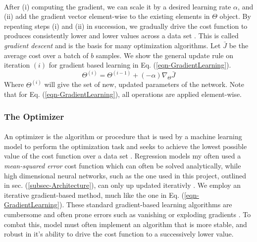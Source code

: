 \documentclass[12pt,letterpaper]{article}
\begin{document}
\paragraph*{}After (i) computing the gradient, we can scale it by a desired learning rate $\alpha$, and (ii) add the gradient vector element-wise to the existing elements in $\Theta$ object. By repeating steps (i) and (ii) in succession, we gradually drive the cost function to produces consistently lower and lower values across a data set \cite{Geron}. This is called \textit{gradient descent} and is the basis for many optimization algorithms. Let $\bar{J}$ be the average cost over a batch of $b$ samples. We show the general update rule on iteration $(i)$ for gradient based learning in Eq. (\ref{eqn-GradientLearning}).
\begin{equation}
\label{eqn-GradientLearning}
\Theta^{(i)} = \Theta^{(i-1)} + (-\alpha) \nabla_{\Theta} \bar{J}
\end{equation}
Where $\Theta^{(i)}$ will give the set of new, updated parameters of the network. Note that for Eq. (\ref{eqn-GradientLearning}), all operations are applied element-wise.


\subsubsection{The Optimizer}

\paragraph*{}An optimizer is the algorithm or procedure that is used by a machine learning model to perform the optimization task and seeks to achieve the lowest possible value of the cost function over a data set \cite{Geron}. Regression models my often used a \textit{mean-squared error} cost function which can often be solved analytically, while high dimensional neural networks, such as the one used in this project, outlined in sec. (\ref{subsec-Architecture}), can only up updated iterativly \cite{Goodfellow,James,Loy}. We employ an iterative gradient-based method, much like the one in Eq. (\ref{eqn-GradientLearning}). These standard gradient-based learning algorithms are cumbersome and often prone errors such as vanishing or exploding gradients \cite{Geron,Goodfellow,Loy}. To combat this, model must often implement an algorithm that is more stable, and robust in it's ability to drive the cost function to a successively lower value.
\end{document}
